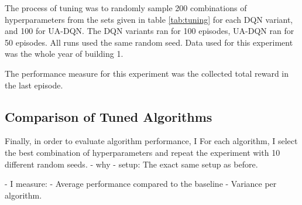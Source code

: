 The process of tuning was to randomly sample 200 combinations of hyperparameters from the sets given in table \ref{tab:tuning} for each DQN variant, and 100 for UA-DQN.
The DQN variants ran for 100 episodes, UA-DQN ran for 50 episodes.
All runs used the same random seed.
Data used for this experiment was the whole year of building 1.

The performance measure for this experiment was the collected total reward in the last episode.

\subsection{Comparison of Tuned Algorithms}
Finally, in order to evaluate algorithm performance, I 
For each algorithm, I select the best combination of hyperparameters and repeat the experiment with 10 different random seeds.
- why
- setup: The exact same setup as before.

- I measure:
    - Average performance compared to the baseline
    - Variance per algorithm.


